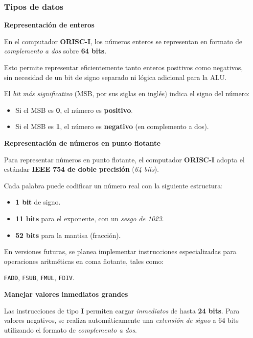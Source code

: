 \documentclass{article}
\begin{document}
\subsubsection{Tipos de datos}

\textbf{Representación de enteros}

En el computador \textbf{ORISC-I}, los números enteros se representan en formato de \textit{complemento a dos} sobre \textbf{64 bits}.

Esto permite representar eficientemente tanto enteros positivos como negativos, sin necesidad de un bit de signo separado ni lógica adicional para la ALU.

El \textit{bit más significativo} (MSB, por sus siglas en inglés) indica el signo del número:

\begin{itemize}
  \item Si el MSB es \textbf{0}, el número es \textbf{positivo}.
  \item Si el MSB es \textbf{1}, el número es \textbf{negativo} (en complemento a dos).
\end{itemize}

\textbf{Representación de números en punto flotante}

Para representar números en punto flotante, el computador \textbf{ORISC-I} adopta el estándar \textbf{IEEE 754 de doble precisión} (\textit{64 bits}).

Cada palabra puede codificar un número real con la siguiente estructura:

\begin{itemize}
  \item \textbf{1 bit} de signo.
  \item \textbf{11 bits} para el exponente, con un \textit{sesgo de 1023}.
  \item \textbf{52 bits} para la mantisa (fracción).
\end{itemize}

En versiones futuras, se planea implementar instrucciones especializadas para operaciones aritméticas en coma flotante, tales como:

\texttt{FADD}, \texttt{FSUB}, \texttt{FMUL}, \texttt{FDIV}.

\textbf{Manejar valores inmediatos grandes}

Las instrucciones de tipo \textbf{I} permiten cargar \textit{inmediatos} de hasta \textbf{24 bits}.
Para valores negativos, se realiza automáticamente una \textit{extensión de signo}
a 64 bits utilizando el formato de \textit{complemento a dos}.
\end{document}
